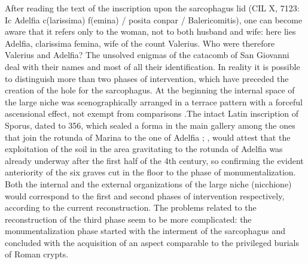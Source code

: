 \documentclass[amsthm,ebook]{saparticle}
\begin{document}
After reading the text of the inscription upon the sarcophagus lid (CIL X, 7123: Ic Adelfia c(larissima) f(emina) / posita conpar / Balericomitis), one can become aware that it refers only to the woman, not to both husband and wife: here lies Adelfia, clarissima femina, wife of the count Valerius. Who were therefore Valerius and Adelfia? The unsolved enigmas of the catacomb of San Giovanni deal with their names and most of all their identification. In reality it is possible to distinguish more than two phases of intervention, which have preceded the creation of the hole for the sarcophagus. At the beginning the internal space of the large niche was scenographically arranged in a terrace pattern with a forceful ascensional effect, not exempt from comparisons \citep[14, plate VII]{NESTORI1973}.The intact Latin inscription of Sporus, dated to 356, which sealed a forma in the main gallery among the ones that join the rotunda of Marina to the one of Adelfia \citep[24]{CAVALLARI 1872}; \citep[90]{AGNELLO1953}, would attest that the exploitation of the soil in the area gravitating to the rotunda of Adelfia was already underway after the first half of the 4th century, so confirming the evident anteriority of the six graves cut in the floor to the phase of monumentalization. Both the internal and the external organizations of the large niche (nicchione) would correspond to the first and second phases of intervention respectively, according to the current reconstruction. The problems related to the reconstruction of the third phase seem to be more complicated: the monumentalization phase started with the interment of the sarcophagus and concluded with the acquisition of an aspect comparable to the privileged burials of Roman crypts.
\end{document}
